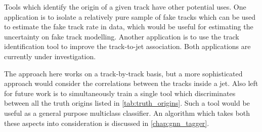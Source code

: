 Tools which identify the origin of a given track have other potential uses.
One application is to isolate a relatively pure sample of fake tracks which can be used to estimate the fake track rate in data, which would be useful for estimating the uncertainty on fake track modelling.
Another application is to use the \bhadron track identification tool to improve the track-to-jet association.
Both applications are currently under investigation.

The approach here works on a track-by-track basis, but a more sophisticated approach would consider the correlations between the tracks inside a jet.
Also left for future work is to simultaneously train a single tool which discriminates between all the truth origins listed in \cref{tab:truth_origins}.
Such a tool would be useful as a general purpose multiclass classifier.
An algorithm which takes both these aspects into consideration
is discussed in \cref{chap:gnn_tagger}.

